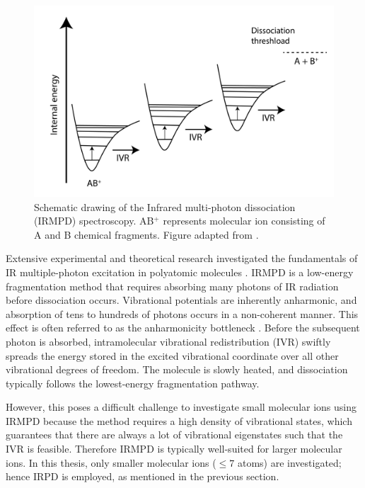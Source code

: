 \begin{figure}[!htb]
    \centering
    \includegraphics[scale=0.5]{figures/intro/IRMPD_IVR.png}
    \caption{Schematic drawing of the Infrared multi-photon dissociation (IRMPD) spectroscopy. AB$^+$ represents molecular ion consisting of A and B chemical fragments. Figure adapted from \cite{cpolfer_infrared_2011}.}
    \label{fig:IRMPD}
\end{figure}

Extensive experimental and theoretical research investigated the fundamentals of IR multiple-photon excitation in polyatomic molecules \cite{black_collisionless_1977, makarov_statistical_1998, oomens_gas-phase_2006, parneix_accurate_2013}. IRMPD is a low-energy fragmentation method that requires absorbing many photons of IR radiation before dissociation occurs. Vibrational potentials are inherently anharmonic, and absorption of tens to hundreds of photons occurs in a non-coherent manner. This effect is often referred to as the anharmonicity bottleneck \cite{steinfeld_molecules_1985}. Before the subsequent photon is absorbed, intramolecular vibrational redistribution (IVR) swiftly spreads the energy stored in the excited vibrational coordinate over all other vibrational degrees of freedom. The molecule is slowly heated, and dissociation typically follows the lowest-energy fragmentation pathway. 

However, this poses a difficult challenge to investigate small molecular ions using IRMPD because the method requires a high density of vibrational states, which guarantees that there are always a lot of vibrational eigenstates such that the IVR is feasible. Therefore IRMPD is typically well-suited for larger molecular ions. In this thesis, only smaller molecular ions ($\leq 7$ atoms) are investigated; hence IRPD is employed, as mentioned in the previous section.

